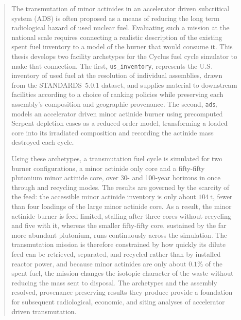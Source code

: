 \documentclass[edeposit,fullpage]{uiucthesis2021}
\begin{document}
\setcounter{page}{3}
\begin{abstract}

The transmutation of minor actinides in an accelerator driven subcritical system
(ADS) is often proposed as a means of reducing the long term radiological hazard
of used nuclear fuel. Evaluating such a mission at the national scale requires
connecting a realistic description of the existing spent fuel inventory to a model
of the burner that would consume it. This thesis develops two facility archetypes
for the Cyclus fuel cycle simulator to make that connection. The first,
\texttt{us\_inventory}, represents the U.S. inventory of used fuel at the
resolution of individual assemblies, drawn from the STANDARDS~5.0.1 dataset, and
supplies material to downstream facilities according to a choice of ranking
policies while preserving each assembly's composition and geographic provenance.
The second, \texttt{ads}, models an accelerator driven minor actinide burner using
precomputed Serpent depletion cases as a reduced order model, transforming a
loaded core into its irradiated composition and recording the actinide mass
destroyed each cycle.

Using these archetypes, a transmutation fuel cycle is simulated for two burner
configurations, a minor actinide only core and a fifty-fifty
plutonium minor actinide core, over 30- and 100-year horizons in once through
and recycling modes. The results are governed by the scarcity of the feed: the
accessible minor actinide inventory is only about \(104~\mathrm{t}\), fewer than
four loadings of the large minor actinide core. As a result, the minor actinide
burner is feed limited, stalling after three cores without recycling and five with
it, whereas the smaller fifty-fifty core, sustained by the far more abundant
plutonium, runs continuously across the simulation. The transmutation mission is
therefore constrained by how quickly its dilute feed can be retrieved, separated,
and recycled rather than by installed reactor power, and because minor actinides are
only about \(0.1\%\) of the spent fuel, the mission changes the isotopic character
of the waste without reducing the mass sent to disposal. The archetypes and the
assembly resolved, provenance preserving results they produce provide a
foundation for subsequent radiological, economic, and siting analyses of
accelerator driven transmutation.

\end{abstract}
\end{document}
